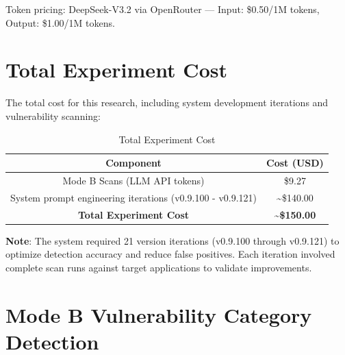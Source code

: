 \documentclass[12pt,a4paper,oneside]{book}
\begin{document}
Token pricing: DeepSeek-V3.2 via OpenRouter — Input: \$0.50/1M tokens, Output: \$1.00/1M tokens.

\section{Total Experiment Cost}

The total cost for this research, including system development iterations and vulnerability scanning:

\begin{table}[h]
\centering
\caption{Total Experiment Cost}
\label{tab:total_cost}
\begin{tabular}{|c|c|}
\hline
\textbf{Component} & \textbf{Cost (USD)} \\ \hline
Mode B Scans (LLM API tokens) & \$9.27 \\ \hline
System prompt engineering iterations (v0.9.100 - v0.9.121) & \textasciitilde\$140.00 \\ \hline
\textbf{Total Experiment Cost} & \textbf{\textasciitilde\$150.00} \\ \hline
\end{tabular}
\end{table}

\textbf{Note}: The system required 21 version iterations (v0.9.100 through v0.9.121) to optimize detection accuracy and reduce false positives. Each iteration involved complete scan runs against target applications to validate improvements.

\section{Mode B Vulnerability Category Detection}
\end{document}

